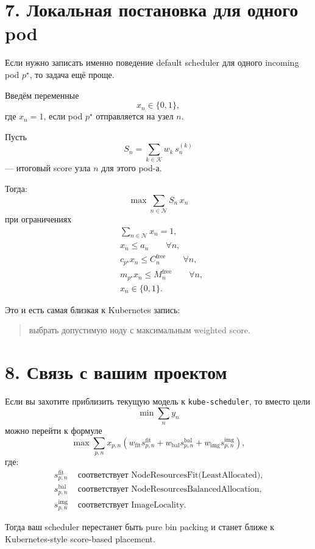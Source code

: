 \documentclass[11pt]{article}
\begin{document}
\section*{7. Локальная постановка для одного pod}

Если нужно записать именно поведение default scheduler для одного incoming pod
\(p^\star\), то задача ещё проще.

Введём переменные
\[
  x_n \in \{0,1\},
\]
где \(x_n=1\), если pod \(p^\star\) отправляется на узел \(n\).

Пусть
\[
  S_n = \sum_{k\in\mathcal{K}} w_k\, s_n^{(k)}
\]
--- итоговый score узла \(n\) для этого pod-а.

Тогда:
\[
  \max \sum_{n\in\mathcal{N}} S_n\, x_n
\]
при ограничениях
\begin{align*}
  &\sum_{n\in\mathcal{N}} x_n = 1, \\
  &x_n \le a_n \qquad \forall n, \\
  &c_{p^\star} x_n \le C_n^{\text{free}} \qquad \forall n, \\
  &m_{p^\star} x_n \le M_n^{\text{free}} \qquad \forall n, \\
  &x_n \in \{0,1\}.
\end{align*}

Это и есть самая близкая к Kubernetes запись:
\begin{quote}
выбрать допустимую ноду с максимальным weighted score.
\end{quote}

\section*{8. Связь с вашим проектом}

Если вы захотите приблизить текущую модель к \texttt{kube-scheduler}, то вместо
цели
\[
  \min \sum_n y_n
\]
можно перейти к формуле
\[
  \max \sum_{p,n} x_{p,n}
  \left(
    w_{\text{fit}} s_{p,n}^{\text{fit}}
    +
    w_{\text{bal}} s_{p,n}^{\text{bal}}
    +
    w_{\text{img}} s_{p,n}^{\text{img}}
  \right),
\]
где:
\begin{align*}
  s_{p,n}^{\text{fit}} &\text{ соответствует NodeResourcesFit(LeastAllocated),} \\
  s_{p,n}^{\text{bal}} &\text{ соответствует NodeResourcesBalancedAllocation,} \\
  s_{p,n}^{\text{img}} &\text{ соответствует ImageLocality.}
\end{align*}

Тогда ваш scheduler перестанет быть pure bin packing и станет ближе к
Kubernetes-style score-based placement.
\end{document}
